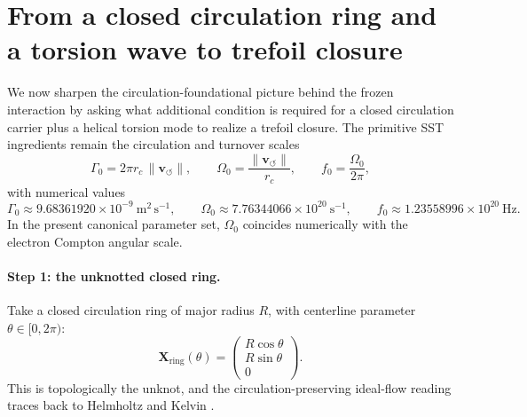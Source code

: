 \documentclass[11pt,a4paper]{article}
\begin{document}
\section{From a closed circulation ring and a torsion wave to trefoil closure}
\label{sec:ring-to-trefoil}

We now sharpen the circulation-foundational picture behind the frozen interaction by asking what additional condition is required for a closed circulation carrier plus a helical torsion mode to realize a trefoil closure. The primitive SST ingredients remain the circulation and turnover scales
\begin{equation}
\Gamma_0 = 2\pi r_c\,\lVert \mathbf{v}_{\!\boldsymbol{\circlearrowleft}}\rVert,
\qquad
\Omega_0 = \frac{\lVert \mathbf{v}_{\!\boldsymbol{\circlearrowleft}}\rVert}{r_c},
\qquad
f_0 = \frac{\Omega_0}{2\pi},
\label{eq:Gamma0Omega0Trefoil}
\end{equation}
with numerical values
\begin{equation}
\Gamma_0 \approx 9.68361920\times 10^{-9}\ \mathrm{m^2\,s^{-1}},
\qquad
\Omega_0 \approx 7.76344066\times 10^{20}\ \mathrm{s^{-1}},
\qquad
f_0 \approx 1.23558996\times 10^{20}\ \mathrm{Hz}.
\label{eq:Gamma0Omega0TrefoilNum}
\end{equation}
In the present canonical parameter set, \(\Omega_0\) coincides numerically with the electron Compton angular scale.

\paragraph{Step 1: the unknotted closed ring.}
Take a closed circulation ring of major radius \(R\), with centerline parameter \(\theta\in[0,2\pi)\):
\begin{equation}
\mathbf{X}_{\mathrm{ring}}(\theta)
=
\begin{pmatrix}
R\cos\theta\\
R\sin\theta\\
0
\end{pmatrix}.
\label{eq:ringcenterlineTrefoil}
\end{equation}
This is topologically the unknot, and the circulation-preserving ideal-flow reading traces back to Helmholtz and Kelvin \cite{Helmholtz1858,Kelvin1869}.
\end{document}

